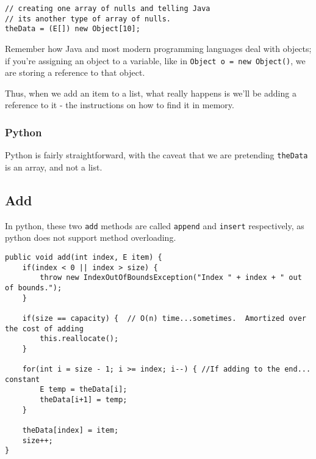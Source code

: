 \begin{verbatim}
// creating one array of nulls and telling Java 
// its another type of array of nulls. 
theData = (E[]) new Object[10];
\end{verbatim}



Remember how Java and most modern programming languages deal with objects; if you're assigning an object to a variable, like in \texttt{Object o = new Object()}, we are storing a reference to that object.

Thus, when we add an item to a list, what really happens is we'll be adding a reference to it - the instructions on how to find it in memory.
\subsubsection{Python}
Python is fairly straightforward, with the caveat that we are pretending \texttt{theData} is an array, and not a list.


%
%
%

\subsection{Add}

In python, these two \texttt{add} methods are called \texttt{append} and \texttt{insert} respectively, as python does not support method overloading.

\begin{verbatim}
public void add(int index, E item) {
	if(index < 0 || index > size) {
		throw new IndexOutOfBoundsException("Index " + index + " out of bounds.");
	}
	
	if(size == capacity) {  // O(n) time...sometimes.  Amortized over the cost of adding
		this.reallocate();
	}
	
	for(int i = size - 1; i >= index; i--) { //If adding to the end... constant
		E temp = theData[i];
		theData[i+1] = temp;
	}
	
	theData[index] = item;
	size++;
}
\end{verbatim}



